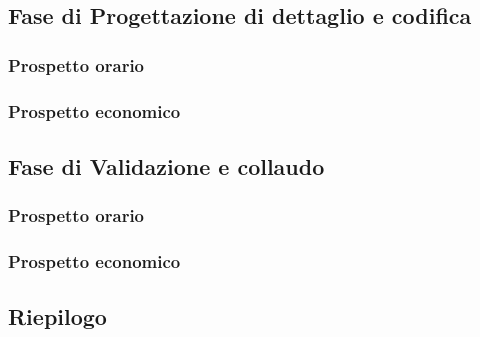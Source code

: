 \subsection{Fase di Progettazione di dettaglio e codifica}
\subsubsection{Prospetto orario}

\subsubsection{Prospetto economico}

\subsection{Fase di Validazione e collaudo}
\subsubsection{Prospetto orario}

\subsubsection{Prospetto economico}

\subsection{Riepilogo}